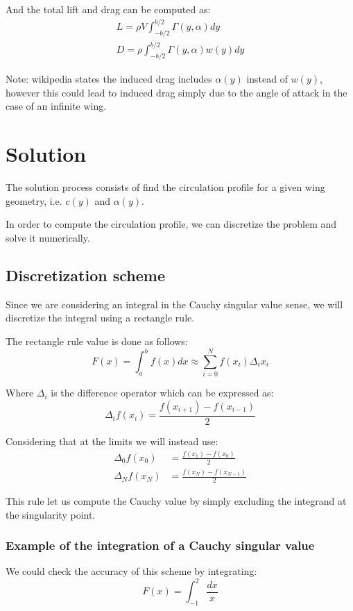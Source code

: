 And the total lift and drag can be computed as:
\begin{align}
    L = \rho V  \int_{-b/2}^{b/2} \Gamma(y, \alpha) dy \\
    D = \rho \int_{-b/2}^{b/2} \Gamma(y, \alpha) w(y) dy
\end{align}

Note: wikipedia states the induced drag includes $\alpha(y)$ instead of $w(y)$, however this could lead to induced drag simply due to the angle of attack in the case of an infinite wing.

\section{Solution}
The solution process consists of find the circulation profile for a given wing geometry, i.e. $c(y)$ and $\alpha(y)$.

In order to compute the circulation profile, we can discretize the problem and solve it numerically.

\subsection{Discretization scheme}
Since we are considering an integral in the Cauchy singular value sense, we will discretize the integral using a rectangle rule.

The rectangle rule value is done as follows:
\begin{equation}
    F(x) = \int_{a}^{b} f(x) dx \approx \sum_{i=0}^{N} f(x_i) \Delta_i x_i
\end{equation}

Where $\Delta_i$ is the difference operator which can be expressed as:
\begin{equation}
    \Delta_i f(x_i) = \frac{f(x_{i+1}) - f(x_{i-1})}{2}
\end{equation}

Considering that at the limits we will instead use:
\begin{align}
    \Delta_0 f(x_0) &= \frac{f(x_1) - f(x_0)}{2} \\
    \Delta_N f(x_N) &= \frac{f(x_N) - f(x_{N-1})}{2}
\end{align}

This rule let us compute the Cauchy value by simply excluding the integrand at the singularity point.

\subsubsection{Example of the integration of a Cauchy singular value}
We could check the accuracy of this scheme by integrating:
\begin{equation}
    F(x) = \int_{-1}^{2}\frac{dx}{x}
\end{equation}

